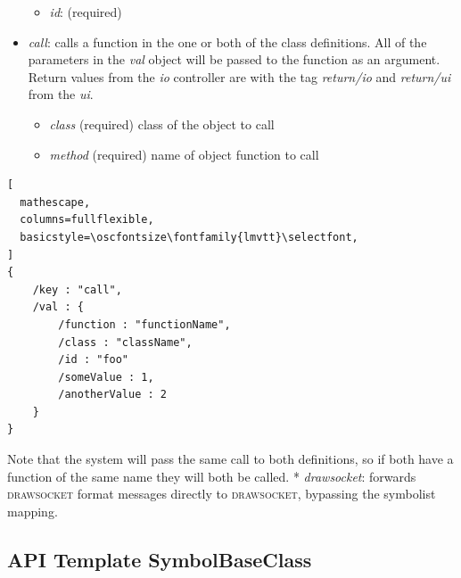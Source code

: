 \documentclass{article}
\def\drawsocket{\textsc{drawsocket}\xspace}
\def\oscfontsize{\footnotesize}
\begin{document}
\begin{itemize}
\begin{itemize}\itemsep0pt 
  \item \textit{id}: (required)
\end{itemize}
\item \textit{call}: calls a function in the one or both of the class definitions. All of the parameters in the \textit{val} object will be passed to the function as an argument. Return values from the \textit{io} controller are with the tag \textit{return/io} and \textit{return/ui} from the \textit{ui}.
\begin{itemize}\itemsep0pt 
  \item \textit{class} (required) class of the object to call
  \item \textit{method} (required) name of object function to call
\end{itemize}

\end{itemize}

\begin{lstlisting}[
  mathescape,
  columns=fullflexible,
  basicstyle=\oscfontsize\fontfamily{lmvtt}\selectfont,
]
{
    /key : "call",
    /val : {
        /function : "functionName",
        /class : "className",
        /id : "foo"
        /someValue : 1,
        /anotherValue : 2
    }
}
\end{lstlisting}

Note that the system will pass the same call to both definitions, so if both have a function of the same name they will both be called.
* \textit{drawsocket}: forwards \drawsocket format messages directly to \drawsocket, bypassing the symbolist mapping.




\subsection{API Template SymbolBaseClass }\label{sec:template}
\end{document}
